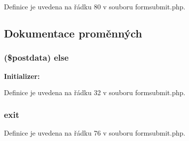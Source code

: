 Definice je uvedena na řádku 80 v souboru formsubmit.\-php.



\subsection{Dokumentace proměnných}
\hypertarget{formsubmit_8php_a5951546b1963bb8260ff900bca822497}{
\subsubsection[{else}]{ (\$postdata) else}}\label{formsubmit_8php_a5951546b1963bb8260ff900bca822497}
{\bfseries Initializer\-:}


Definice je uvedena na řádku 32 v souboru formsubmit.\-php.

\hypertarget{formsubmit_8php_a6733eb5f605d09eaede9845835d71c4e}{
\subsubsection[{exit}]{\setlength{\rightskip}{0pt plus 5cm}exit}}\label{formsubmit_8php_a6733eb5f605d09eaede9845835d71c4e}


Definice je uvedena na řádku 76 v souboru formsubmit.\-php.

